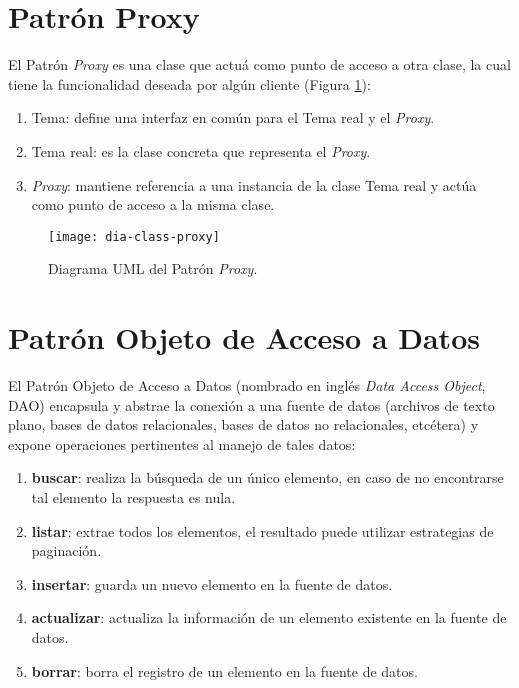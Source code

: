 \section{Patrón Proxy}\label{sec:proxy}
El Patrón \textit{Proxy} es una clase que actuá como punto de acceso a otra clase, la cual tiene la funcionalidad deseada por algún cliente\cite{DesignPatternsLasater} (Figura \ref{fig:dia-class-proxy}):
\begin{enumerate}
  \item Tema: define una interfaz en común para el Tema real y el \textit{Proxy}.
  \item Tema real: es la clase concreta que representa el \textit{Proxy}.
  \item \textit{Proxy}: mantiene referencia a una instancia de la clase Tema real y actúa como punto de acceso a la misma clase.
\end{enumerate}
\begin{figure}[h]
  \centering
  \texttt{[image: dia-class-proxy]}
  \caption{Diagrama UML del Patrón \textit{Proxy}\cite{DesignPatternsLasater}.}
  \label{fig:dia-class-proxy}
\end{figure}

\section{Patrón Objeto de Acceso a Datos}\label{sec:dao}
El Patrón Objeto de Acceso a Datos (nombrado en inglés \textit{Data Access Object}, DAO) encapsula y abstrae la conexión a una fuente de datos (archivos de texto plano, bases de datos relacionales, bases de datos no relacionales, etcétera) y expone operaciones pertinentes al manejo de tales datos\cite{OCPJavaSE7,OCAPJavaSE7}:
\begin{enumerate}
	\item [] \textbf{buscar}: realiza la búsqueda de un único elemento, en caso de no encontrarse tal elemento la respuesta es nula.
	\item [] \textbf{listar}: extrae todos los elementos, el resultado puede utilizar estrategias de paginación.
	\item [] \textbf{insertar}: guarda un nuevo elemento en la fuente de datos.
	\item [] \textbf{actualizar}: actualiza la información de un elemento existente en la fuente de datos.
	\item [] \textbf{borrar}: borra el registro de un elemento en la fuente de datos.
\end{enumerate}


